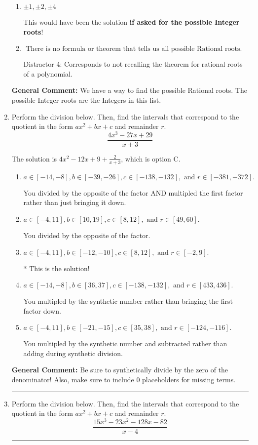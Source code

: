 \documentclass{extbook}[14pt]
\newcommand{\litem}[1]{\item #1

\rule{\textwidth}{0.4pt}}
\begin{document}
\begin{enumerate}
{\begin{enumerate}[label=\Alph*.]
* This is the solution \textbf{since we asked for the possible Rational roots}!
\item \( \pm 1,\pm 2,\pm 4 \)

This would have been the solution \textbf{if asked for the possible Integer roots}!
\item \( \text{ There is no formula or theorem that tells us all possible Rational roots.} \)

 Distractor 4: Corresponds to not recalling the theorem for rational roots of a polynomial.
\end{enumerate}

\textbf{General Comment:} We have a way to find the possible Rational roots. The possible Integer roots are the Integers in this list.
}
\litem{
Perform the division below. Then, find the intervals that correspond to the quotient in the form $ax^2+bx+c$ and remainder $r$.
\[ \frac{4x^{3} -27 x + 29}{x + 3} \]

The solution is \( 4x^{2} -12 x + 9 + \frac{2}{x + 3} \), which is option C.\begin{enumerate}[label=\Alph*.]
\item \( a \in [-14, -8], b \in [-39, -26], c \in [-138, -132], \text{ and } r \in [-381, -372]. \)

 You divided by the opposite of the factor AND multipled the first factor rather than just bringing it down.
\item \( a \in [-4, 11], b \in [10, 19], c \in [8, 12], \text{ and } r \in [49, 60]. \)

 You divided by the opposite of the factor.
\item \( a \in [-4, 11], b \in [-12, -10], c \in [8, 12], \text{ and } r \in [-2, 9]. \)

* This is the solution!
\item \( a \in [-14, -8], b \in [36, 37], c \in [-138, -132], \text{ and } r \in [433, 436]. \)

 You multipled by the synthetic number rather than bringing the first factor down.
\item \( a \in [-4, 11], b \in [-21, -15], c \in [35, 38], \text{ and } r \in [-124, -116]. \)

 You multipled by the synthetic number and subtracted rather than adding during synthetic division.
\end{enumerate}

\textbf{General Comment:} Be sure to synthetically divide by the zero of the denominator! Also, make sure to include 0 placeholders for missing terms.
}
\litem{
Perform the division below. Then, find the intervals that correspond to the quotient in the form $ax^2+bx+c$ and remainder $r$.
\[ \frac{15x^{3} -23 x^{2} -128 x -82}{x -4} \]

}
\end{enumerate}
\end{document}
